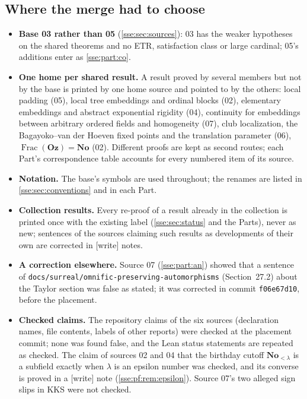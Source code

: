 \documentclass[11pt,a4paper]{article}
\numberwithin{equation}{section}
\theoremstyle{plain}
\theoremstyle{definition}
\theoremstyle{remark}
\newcommand{\No}{\mathbf{No}}
\newcommand{\Oz}{\mathbf{Oz}}
\newcommand{\code}[1]{\texttt{\small #1}}
\newcommand{\fn}[1]{\nolinkurl{#1}}%
\newcommand{\wtag}{\textup{\textsf{[write]}}}%
\begin{document}
\subsection{Where the merge had to choose}
\begin{itemize}
\item \textbf{Base 03 rather than 05} (\cref{sse:sec:sources}): 03 has the
weaker hypotheses on the shared theorems and no ETR, satisfaction class or
large cardinal; 05's additions enter as \cref{sse:part:co}.
\item \textbf{One home per shared result.} A result proved by several
members but not by the base is printed by one home source and pointed to by
the others: local padding (05), local tree embeddings and ordinal blocks
(02), elementary embeddings and abstract exponential rigidity (04),
continuity for embeddings between arbitrary ordered fields and homogeneity
(07), club localization, the Bagayoko--van der Hoeven fixed points and the
translation parameter (06), $\operatorname{Frac}(\Oz)=\No$ (02). Different proofs are kept
as second routes; each Part's correspondence table accounts for every
numbered item of its source.
\item \textbf{Notation.} The base's symbols are used throughout; the renames
are listed in \cref{sse:sec:conventions} and in each Part.
\item \textbf{Collection results.} Every re-proof of a result already in
the collection is printed once with the existing label (\cref{sse:sec:status}
and the Parts), never as new; sentences of the sources claiming such
results as developments of their own are corrected in \wtag{} notes.
\item \textbf{A correction elsewhere.} Source 07 (\cref{sse:part:an}) showed
that a sentence of \fn{docs/surreal/omnific-preserving-automorphisms}
(Section~27.2) about the Taylor section was false as stated; it was
corrected in commit \code{f06e67d10}, before the placement.
\item \textbf{Checked claims.} The repository claims of the six sources
(declaration names, file contents, labels of other reports) were checked at
the placement commit; none was found false, and the Lean status statements
are repeated as checked. The claim of sources 02 and 04 that the birthday
cutoff $\No_{<\lambda}$ is a subfield exactly when $\lambda$ is an epsilon
number was checked, and its converse is proved in a \wtag{} note
(\cref{sse:pf:rem:epsilon}). Source 07's two alleged sign slips in KKS were not
checked.
\end{itemize}
\end{document}
